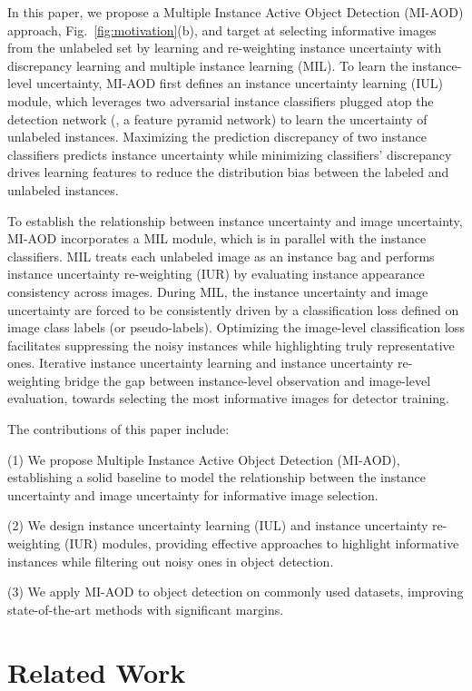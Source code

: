 \documentclass[final]{cvpr}
\begin{document}
In this paper, we propose a Multiple Instance Active Object Detection (MI-AOD) approach, Fig.~\ref{fig:motivation}(b), and target at selecting informative images from the unlabeled set by learning and re-weighting instance uncertainty with discrepancy learning and multiple instance learning (MIL). To learn the instance-level uncertainty, MI-AOD first defines an instance uncertainty learning (IUL) module, which leverages two adversarial instance classifiers plugged atop the detection network (\eg, a feature pyramid network) to learn the uncertainty of unlabeled instances. Maximizing the prediction discrepancy of two instance classifiers predicts instance uncertainty while minimizing classifiers’ discrepancy drives learning features to reduce the distribution bias between the labeled and unlabeled instances. 

To establish the relationship between instance uncertainty and image uncertainty, MI-AOD incorporates a MIL module, which is in parallel with the instance classifiers. MIL treats each unlabeled image as an instance bag and performs instance uncertainty re-weighting (IUR) by evaluating instance appearance consistency across images. During MIL, the instance uncertainty and image uncertainty are forced to be consistently driven by a classification loss defined on image class labels (or pseudo-labels). Optimizing the image-level classification loss facilitates suppressing the noisy instances while highlighting truly representative ones. Iterative instance uncertainty learning and instance uncertainty re-weighting bridge the gap between instance-level observation and image-level evaluation, towards selecting the most informative images for detector training.

The contributions of this paper include:

(1) We propose Multiple Instance Active Object Detection (MI-AOD), establishing a solid baseline to model the relationship between the instance uncertainty and image uncertainty for informative image selection. 

(2) We design instance uncertainty learning (IUL) and instance uncertainty re-weighting (IUR) modules, providing effective approaches to highlight informative instances while filtering out noisy ones in object detection.

(3) We apply MI-AOD to object detection on commonly used datasets, improving state-of-the-art methods with significant margins.

\section{Related Work}
\end{document}
